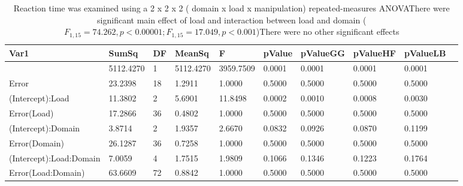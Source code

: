 \begin{table}[!hbt]
\centering
\begin{tabular}[0.2em]{@{}llllllllll@{}}\toprule
Var1 & SumSq & DF & MeanSq & F & pValue & pValueGG & pValueHF & pValueLB\\\toprule[0.2em]
(Intercept) & 5112.4270 & 1 & 5112.4270 & 3959.7509 & 0.0001 & 0.0001 & 0.0001 & 0.0001 \\\midrule
Error & 23.2398 & 18 & 1.2911 & 1.0000 & 0.5000 & 0.5000 & 0.5000 & 0.5000 \\\midrule
(Intercept):Load & 11.3802 & 2 & 5.6901 & 11.8498 & 0.0002 & 0.0010 & 0.0008 & 0.0030 \\\midrule
Error(Load) & 17.2866 & 36 & 0.4802 & 1.0000 & 0.5000 & 0.5000 & 0.5000 & 0.5000 \\\midrule
(Intercept):Domain & 3.8714 & 2 & 1.9357 & 2.6670 & 0.0832 & 0.0926 & 0.0870 & 0.1199 \\\midrule
Error(Domain) & 26.1287 & 36 & 0.7258 & 1.0000 & 0.5000 & 0.5000 & 0.5000 & 0.5000 \\\midrule
(Intercept):Load:Domain & 7.0059 & 4 & 1.7515 & 1.9809 & 0.1066 & 0.1346 & 0.1223 & 0.1764 \\\midrule
Error(Load:Domain) & 63.6609 & 72 & 0.8842 & 1.0000 & 0.5000 & 0.5000 & 0.5000 & 0.5000 \\\bottomrule[0.2em]
\end{tabular}
\caption{Reaction time was examined using a 2 x 2 x 2 ( domain x load x manipulation) repeated-measures ANOVAThere were significant main effect of load and interaction between load and domain ($F_{1,15}=74.262, p<0.00001;F_{1,15}=17.049, p<0.001$)There were no other significant effects\label{tabel:behStudy1Acc}}
\end{table}
